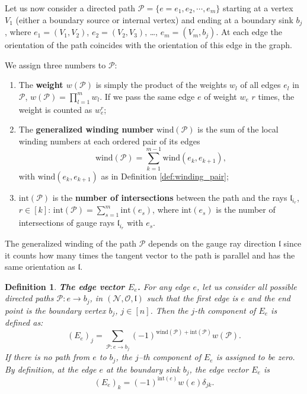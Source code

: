 \documentclass[11pt]{amsart}
\theoremstyle{plain}
\numberwithin{equation}{section}
\newtheorem{definition}{Definition}[subsection]
\begin{document}
\begin{figure}%
\end{figure}

Let us now consider a directed path ${\mathcal P}=\{e=e_1,e_2,\cdots, e_m\}$ starting at a vertex $V_1$ (either a boundary source or internal vertex) and ending at a 
boundary sink $b_j$, where $e_1=(V_1,V_2)$, $e_2=(V_2,V_3)$, \ldots, $e_m=(V_m,b_j)$. At each edge the orientation of the path coincides with the orientation of this edge in the graph.

We assign three numbers to ${\mathcal P}$:
\begin{enumerate}
\item The \textbf{weight $w({\mathcal P})$} is simply the product of the weights $w_l$ of all edges $e_l$ in ${\mathcal P}$, $w({\mathcal P})=\prod_{l=1}^m w_l$. If we pass the 
same edge $e$ of weight $w_e$ $r$ times, the weight is counted as $w_e^r$;
\item The \textbf{generalized winding number} $\mbox{wind}({\mathcal P})$ is the sum of the local winding numbers at each ordered pair of its edges
\[
\mbox{wind}(\mathcal P) = \sum_{k=1}^{m-1} \mbox{wind}(e_k,e_{k+1}),
\]
with $\mbox{wind}(e_k,e_{k+1})$ as in Definition \ref{def:winding_pair}; 
\item $\mbox{int}(\mathcal P)$ is the \textbf{number  of intersections} between the path and the rays ${\mathfrak l}_{i_r}$, $r\in[k]$: $\mbox{int}(\mathcal P) = \sum\limits_{s=1}^m \mbox{int}(e_s)$, where $\mbox{int}(e_s)$ is the number of intersections of gauge rays ${\mathfrak l}_{i_r}$ with $e_s$.
\end{enumerate}
The generalized winding of the path $\mathcal P$ depends on the gauge ray direction $\mathfrak{l}$ since it
counts how many times the tangent vector to the 
path is parallel and has the same orientation as ${\mathfrak l}$.

\begin{definition}\label{def:edge_vector}\textbf{The edge vector $E_e$.}
For any edge $e$, let us consider all possible directed paths ${\mathcal P}:e\rightarrow b_{j}$, 
in $({\mathcal N},{\mathcal O},{\mathfrak l})$ such that the first edge is $e$ and the end point is the boundary vertex $b_{j}$, $j\in[n]$.
Then the $j$-th component of $E_{e}$ is defined as:
\begin{equation}\label{eq:sum}
\left(E_{e}\right)_{j} = \sum\limits_{{\mathcal P}:e\rightarrow b_{j}} (-1)^{\mbox{wind}({\mathcal P})+ \mbox{int}({\mathcal P})} 
w({\mathcal P}).
\end{equation}
If there is no path from $e$ to $b_{j}$, the $j$--th component of $E_e$ is assigned to be zero. By definition, at the edge $e$ at the boundary sink $b_j$, the edge vector $E_{e}$ is
\begin{equation}\label{eq:vec_bou_sink}
\left(E_{e}\right)_{k} =  (-1)^{\mbox{int}(e)} w(e) \delta_{jk}.
\end{equation}
\end{definition}
\end{document}
